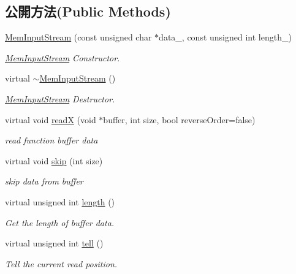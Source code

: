 \subsection*{公開方法(Public Methods)}
\begin{DoxyCompactItemize}
\item 
\hyperlink{class_i_dream_sky_1_1_mem_input_stream_a2f936e06489b17b08fe2a4e26d5f1524}{Mem\+Input\+Stream} (const unsigned char $\ast$data\+\_\+, const unsigned int length\+\_\+)
\begin{DoxyCompactList}\small\item\em \hyperlink{class_i_dream_sky_1_1_mem_input_stream}{Mem\+Input\+Stream} Constructor. \end{DoxyCompactList}\item 
virtual \hyperlink{class_i_dream_sky_1_1_mem_input_stream_a0bea7e162851acf927fd49e693618ed5}{$\sim$\+Mem\+Input\+Stream} ()
\begin{DoxyCompactList}\small\item\em \hyperlink{class_i_dream_sky_1_1_mem_input_stream}{Mem\+Input\+Stream} Destructor. \end{DoxyCompactList}\item 
virtual void \hyperlink{class_i_dream_sky_1_1_mem_input_stream_a46a5d350cad7a038b4e12d5698b5a4ba}{readX} (void $\ast$buffer, int size, bool reverse\+Order=false)
\begin{DoxyCompactList}\small\item\em read function buffer data \end{DoxyCompactList}\item 
virtual void \hyperlink{class_i_dream_sky_1_1_mem_input_stream_a9333680c5aa2ec6bcabfd15220c82e58}{skip} (int size)
\begin{DoxyCompactList}\small\item\em skip data from buffer \end{DoxyCompactList}\item 
virtual unsigned int \hyperlink{class_i_dream_sky_1_1_mem_input_stream_afe3986e5078df73b8ad7fd058964fa0c}{length} ()
\begin{DoxyCompactList}\small\item\em Get the length of buffer data. \end{DoxyCompactList}\item 
virtual unsigned int \hyperlink{class_i_dream_sky_1_1_mem_input_stream_a533bcf2b8e5b63c080656824fae97aa9}{tell} ()
\begin{DoxyCompactList}\small\item\em Tell the current read position. \end{DoxyCompactList}\item 

\end{DoxyCompactItemize}
